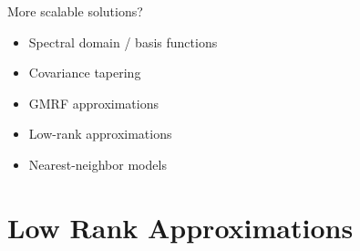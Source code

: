 \documentclass[11pt,ignorenonframetext,]{beamer}
\providecommand{\tightlist}{%
  \setlength{\itemsep}{0pt}\setlength{\parskip}{0pt}}
\begin{document}
\begin{frame}{More scalable solutions?}
\protect\hypertarget{more-scalable-solutions}{}

\large

\begin{itemize}
\tightlist
\item
  Spectral domain / basis functions
\end{itemize}

\vspace{3mm}

\begin{itemize}
\tightlist
\item
  Covariance tapering
\end{itemize}

\vspace{3mm}

\begin{itemize}
\tightlist
\item
  GMRF approximations
\end{itemize}

\vspace{3mm}

\begin{itemize}
\tightlist
\item
  Low-rank approximations
\end{itemize}

\vspace{3mm}

\begin{itemize}
\tightlist
\item
  Nearest-neighbor models
\end{itemize}

\end{frame}

\hypertarget{low-rank-approximations}{%
\section{Low Rank Approximations}\label{low-rank-approximations}}
\end{document}

